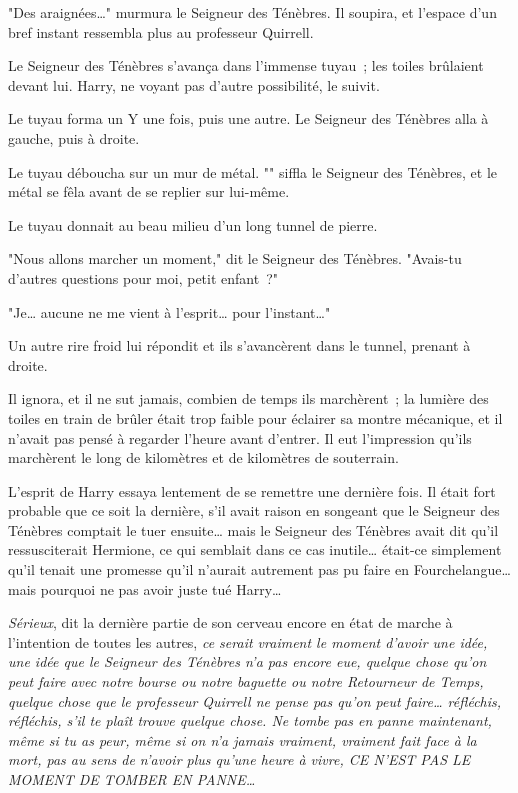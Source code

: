 "Des araignées…" murmura le Seigneur des Ténèbres. Il soupira, et l'espace d'un bref instant ressembla plus au professeur Quirrell.

Le Seigneur des Ténèbres s'avança dans l'immense tuyau~; les toiles brûlaient devant lui. Harry, ne voyant pas d'autre possibilité, le suivit.

Le tuyau forma un Y une fois, puis une autre. Le Seigneur des Ténèbres alla à gauche, puis à droite.

Le tuyau déboucha sur un mur de métal. "" siffla le Seigneur des Ténèbres, et le métal se fêla avant de se replier sur lui-même.

Le tuyau donnait au beau milieu d'un long tunnel de pierre.

"Nous allons marcher un moment," dit le Seigneur des Ténèbres. "Avais-tu d'autres questions pour moi, petit enfant~?"

"Je… aucune ne me vient à l'esprit… pour l'instant…"

Un autre rire froid lui répondit et ils s'avancèrent dans le tunnel, prenant à droite.

Il ignora, et il ne sut jamais, combien de temps ils marchèrent~; la lumière des toiles en train de brûler était trop faible pour éclairer sa montre mécanique, et il n'avait pas pensé à regarder l'heure avant d'entrer. Il eut l'impression qu'ils marchèrent le long de kilomètres et de kilomètres de souterrain.

L'esprit de Harry essaya lentement de se remettre une dernière fois. Il était fort probable que ce soit la dernière, s'il avait raison en songeant que le Seigneur des Ténèbres comptait le tuer ensuite… mais le Seigneur des Ténèbres avait dit qu'il ressusciterait Hermione, ce qui semblait dans ce cas inutile… était-ce simplement qu'il tenait une promesse qu'il n'aurait autrement pas pu faire en Fourchelangue… mais pourquoi ne pas avoir juste tué Harry…

\emph{Sérieux}, dit la dernière partie de son cerveau encore en état de marche à l'intention de toutes les autres, \emph{ce serait vraiment le moment d'avoir une idée, une idée que le Seigneur des Ténèbres n'a pas encore eue, quelque chose qu'on peut faire avec notre bourse ou notre baguette ou notre Retourneur de Temps, quelque chose que le professeur Quirrell ne pense pas qu'on peut faire… réfléchis, réfléchis, s'il te plaît trouve quelque chose. Ne tombe pas en panne maintenant, même si tu as peur, même si on n'a jamais vraiment, vraiment fait face à la mort, pas au sens de n'avoir plus qu'une heure à vivre, CE N'EST PAS LE MOMENT DE TOMBER EN PANNE…}

